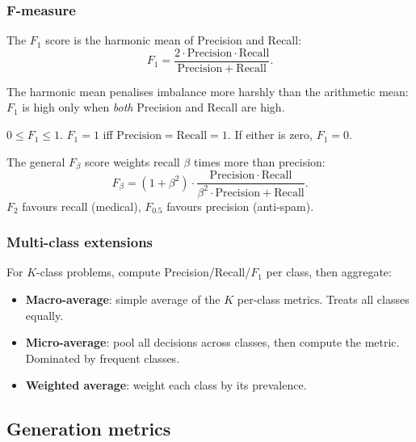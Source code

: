 \subsubsection*{F-measure}

\begin{definition}[$F_1$ score]
The $F_1$ score is the harmonic mean of Precision and Recall:
\[ F_1 = \frac{2 \cdot \mathrm{Precision} \cdot \mathrm{Recall}}{\mathrm{Precision} + \mathrm{Recall}}. \]
\end{definition}

The harmonic mean penalises imbalance more harshly than the arithmetic mean: $F_1$ is high only when \emph{both} Precision and Recall are high.

\begin{property}[Bounds of $F_1$]
$0 \le F_1 \le 1$. $F_1 = 1$ iff $\mathrm{Precision} = \mathrm{Recall} = 1$. If either is zero, $F_1 = 0$.
\end{property}

\begin{remark}
The general $F_\beta$ score weights recall $\beta$ times more than precision:
\[ F_\beta = (1 + \beta^2) \cdot \frac{\mathrm{Precision} \cdot \mathrm{Recall}}{\beta^2 \cdot \mathrm{Precision} + \mathrm{Recall}}. \]
$F_2$ favours recall (medical), $F_{0.5}$ favours precision (anti-spam).
\end{remark}

\subsubsection*{Multi-class extensions}

For $K$-class problems, compute Precision/Recall/$F_1$ per class, then aggregate:
\begin{itemize}
    \item \textbf{Macro-average}: simple average of the $K$ per-class metrics. Treats all classes equally.
    \item \textbf{Micro-average}: pool all decisions across classes, then compute the metric. Dominated by frequent classes.
    \item \textbf{Weighted average}: weight each class by its prevalence.
\end{itemize}

\subsection{Generation metrics}
\label{sec:eval-generation}

